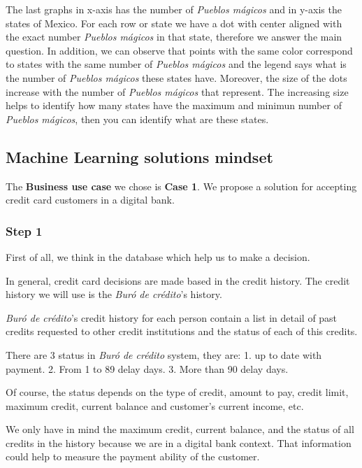 \documentclass[11pt]{article}
\begin{document}
    The last graphs in x-axis has the number of \emph{Pueblos mágicos} and
in y-axis the states of Mexico. For each row or state we have a dot with
center aligned with the exact number \emph{Pueblos mágicos} in that
state, therefore we answer the main question. In addition, we can
observe that points with the same color correspond to states with the
same number of \emph{Pueblos mágicos} and the legend says what is the
number of \emph{Pueblos mágicos} these states have. Moreover, the size
of the dots increase with the number of \emph{Pueblos mágicos} that
represent. The increasing size helps to identify how many states have
the maximum and minimun number of \emph{Pueblos mágicos}, then you can
identify what are these states.

    \hypertarget{machine-learning-solutions-mindset}{%
\subsection{Machine Learning solutions
mindset}\label{machine-learning-solutions-mindset}}

    The \textbf{Business use case} we chose is \textbf{Case 1}. We propose
a solution for accepting credit card customers in a digital bank.

    \hypertarget{step-1}{%
\subsubsection{Step 1}\label{step-1}}

First of all, we think in the database which help us to make a decision.

In general, credit card decisions are made based in the credit history.
The credit history we will use is the \emph{Buró de crédito}'s history.

\emph{Buró de crédito}'s credit history for each person contain a list
in detail of past credits requested to other credit institutions and the
status of each of this credits.

There are 3 status in \emph{Buró de crédito} system, they are: 1. up to
date with payment. 2. From 1 to 89 delay days. 3. More than 90 delay
days.

Of course, the status depends on the type of credit, amount to pay,
credit limit, maximum credit, current balance and customer's current
income, etc.

We only have in mind the maximum credit, current balance, and the status
of all credits in the history because we are in a digital bank context.
That information could help to measure the payment ability of the
customer.
\end{document}
